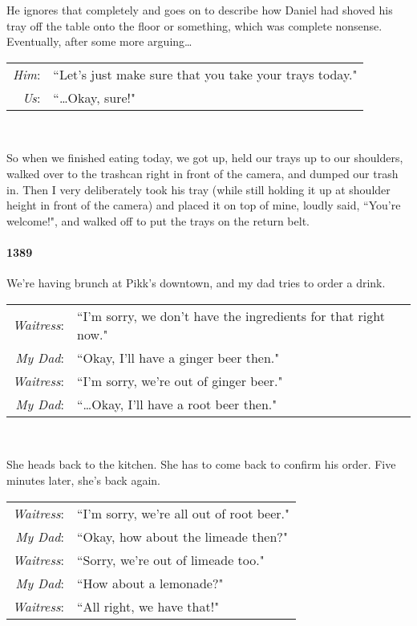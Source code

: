 \documentclass[10pt]{memoir}
\newcommand{\speakertag}[1]{\emph{#1}: }
\newcommand{\st}{\speakertag}
\begin{document}
\noindent He ignores that completely and goes on to describe how Daniel had shoved his tray off the table onto the floor or something, which was complete nonsense. Eventually, after some more arguing\ldots\\

\noindent \begin{tabularx}{\textwidth}{r X}
\st{Him} & ``Let's just make sure that you take your trays today."\\
\st{Us} & ``\ldots Okay, sure!"
\end{tabularx}\\\smallskip

\noindent So when we finished eating today, we got up, held our trays up to our shoulders, walked over to the trashcan right in front of the camera, and dumped our trash in. Then I very deliberately took his tray (while still holding it up at shoulder height in front of the camera) and placed it on top of mine, loudly said, ``You're welcome!", and walked off to put the trays on the return belt.


\paragraph{1389} We're having brunch at Pikk's downtown, and my dad tries to order a drink.\\

\noindent \begin{tabularx}{\textwidth}{r X}
\st{Waitress} & ``I'm sorry, we don't have the ingredients for that right now." \\
\st{My Dad} & ``Okay, I'll have a ginger beer then." \\
\st{Waitress} & ``I'm sorry, we're out of ginger beer." \\
\st{My Dad} & ``\ldots Okay, I'll have a root beer then." \\
\end{tabularx}\\\smallskip

\noindent She heads back to the kitchen. She has to come back to confirm his order. Five minutes later, she's back again.\\

\noindent \begin{tabularx}{\textwidth}{r X}
\st{Waitress} & ``I'm sorry, we're all out of root beer." \\
\st{My Dad} & ``Okay, how about the limeade then?" \\
\st{Waitress} & ``Sorry, we're out of limeade too." \\
\st{My Dad} & ``How about a lemonade?" \\
\st{Waitress} & ``All right, we have that!" \\
\end{tabularx}
\end{document}
